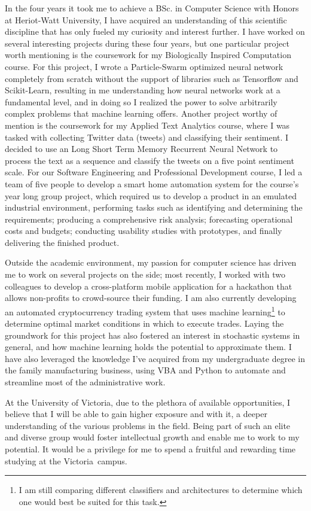 \documentclass[a4paper,11pt]{article}
\newcommand{\uni}{the University of Victoria}
\newcommand{\city}{Victoria}
\newcommand{\hw}{Heriot-Watt University}
\begin{document}
In the four years it took me to achieve a BSc. in Computer Science with Honors at \hw, I have acquired an understanding of this scientific discipline that has only fueled my curiosity and interest further. I have worked on several interesting projects during these four years, but one particular project worth mentioning is the coursework for my Biologically Inspired Computation course. For this project, I wrote a Particle-Swarm optimized neural network completely from scratch without the support of libraries such as Tensorflow and Scikit-Learn, resulting in me understanding how neural networks work at a fundamental level, and in doing so I realized the power to solve arbitrarily complex problems that machine learning offers. Another project worthy of mention is the coursework for my Applied Text Analytics course, where I was tasked with collecting Twitter data (tweets) and classifying their sentiment.  I decided to use an Long Short Term Memory Recurrent Neural Network to process the text as a sequence and classify the tweets on a five point sentiment scale.  For our Software Engineering and Professional Development course, I led a team of five people to develop a smart home automation system for the course's year long group project, which required us to develop a product in an emulated industrial environment,  performing tasks such as identifying and determining the requirements; producing a comprehensive risk analysis; forecasting operational costs and budgets; conducting usability studies with prototypes, and finally delivering the finished product.

Outside the academic environment, my passion for computer science has driven me to work on several projects on the side; most recently, I worked with two colleagues to develop a cross-platform mobile application for a hackathon that allows non-profits to crowd-source their funding. I am also currently developing an automated cryptocurrency trading system that uses machine learning\footnote{I am still comparing different classifiers and architectures to determine which one would best be suited for this task.} to determine optimal market conditions in which to execute trades.  Laying the groundwork for this project has also fostered an interest in stochastic systems in general, and how machine learning holds the potential to approximate them. I have also leveraged the knowledge I've acquired from my undergraduate degree in the family manufacturing business, using VBA and Python to automate and streamline most of the administrative work.

At \uni, due to the plethora of available opportunities, I believe that I will be able to gain higher exposure and with it, a deeper understanding of the various problems in the field. Being part of such an elite and diverse group would foster intellectual growth and enable me to work to my potential. It would be a privilege for me to spend a fruitful and rewarding time studying at the \city\ campus.

\printbibliography
\end{document}
